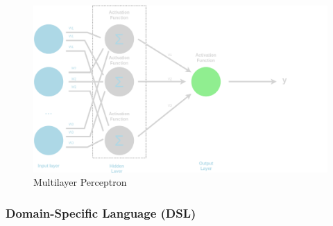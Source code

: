 \begin{figure}[H]
    \centering
    \includegraphics[width=\textwidth]{images/mlp.png}\caption{Multilayer Perceptron}\label{fig:mlp}
\end{figure}







\subsubsection{Domain-Specific Language (DSL)}

